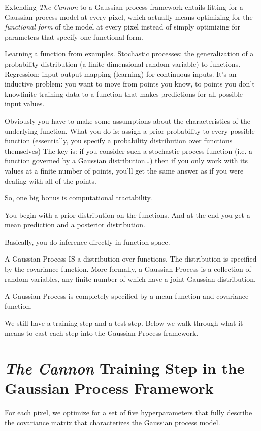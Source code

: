 \documentclass[12pt, preprint]{aastex}
\begin{document}
Extending \emph{The Cannon} to a Gaussian process framework entails fitting 
for a Gaussian process model at every pixel, which actually means optimizing 
for the \emph{functional form} of the model at every pixel instead of simply 
optimizing for parameters that specify one functional form.

Learning a function from examples. Stochastic processes: the generalization 
of a probability distribution (a finite-dimensional random variable) to 
functions. Regression: input-output mapping (learning) for continuous inputs. 
It's an inductive problem: you want to move from points you know, to points 
you don't know\ldotsfrom finite training data to a function that makes 
predictions for all possible input values.

Obviously you have to make some assumptions about the characteristics of the 
underlying function. What you do is: assign a prior probability to every 
possible function (essentially, you specify a probability distribution over 
functions themselves) The key is: if you consider such a stochastic process 
function (i.e. a function governed by a Gaussian distribution\ldots) then if 
you only work with its values at a finite number of points, you'll get the 
same answer as if you were dealing with all of the points.

So, one big bonus is computational tractability.

You begin with a prior distribution on the functions. And at the end you get 
a mean prediction and a posterior distribution.

Basically, you do inference directly in function space.

A Gaussian Process IS a distribution over functions. The distribution is 
specified by the covariance function. More formally, a Gaussian Process 
is a collection of random variables, any finite number of which have a 
joint Gaussian distribution.

A Gaussian Process is completely specified by a mean function and covariance 
function.

We still have a training step and a test step. Below we walk through what it 
means to cast each step into the Gaussian Process framework.

\section{\emph{The Cannon} Training Step in the Gaussian Process Framework}

For each pixel, we optimize for a set of five hyperparameters that fully 
describe the covariance matrix that characterizes the Gaussian process model.
\end{document}
